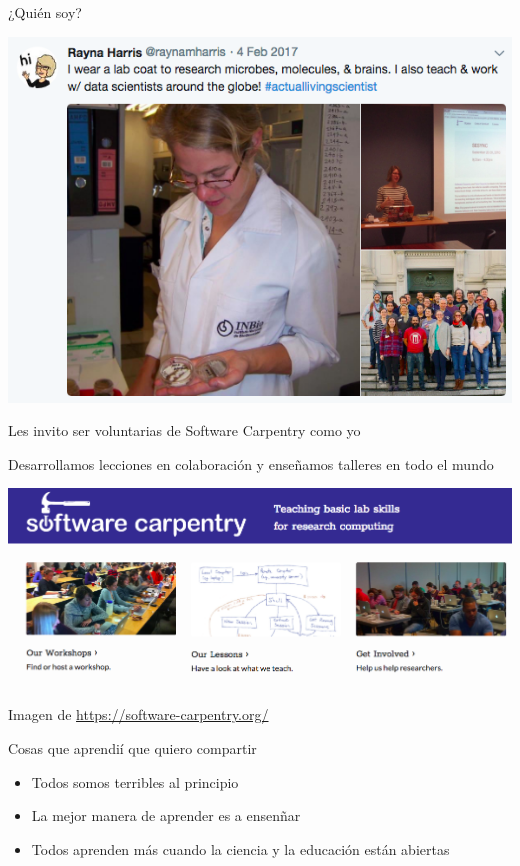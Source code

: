 \begin{frame}{¿Quién soy?}

\includegraphics{../figures/talk/twitter.png}

\end{frame}

\begin{frame}{Les invito ser voluntarias de Software Carpentry como yo}

Desarrollamos lecciones en colaboración y enseñamos talleres en todo el
mundo

\includegraphics{../figures/talk/swc.png}

Imagen de \url{https://software-carpentry.org/}

\end{frame}

\begin{frame}{Cosas que aprendií que quiero compartir}

\begin{itemize}[<+->]
\tightlist
\item
  Todos somos terribles al principio
\item
  La mejor manera de aprender es a ensenñar
\item
  Todos aprenden más cuando la ciencia y la educación están abiertas
\end{itemize}

\end{frame}

